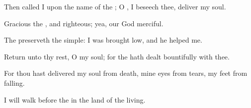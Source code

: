 {\par }{\Q {}Then
called I upon the
name of the
{}; O
{}, I
beseech thee,
deliver my
soul.


\par }{\Q {}Gracious
{} the
{}, and
righteous; yea, our
God
{}
merciful.


\par }{\Q {}The
{}
preserveth the
simple: I was brought
low, and he
helped me.


\par }{\Q {}Return unto thy
rest, O my
soul; for the
{} hath dealt
bountifully with thee.


\par }{\Q {}For thou hast
delivered my
soul from
death, mine
eyes from
tears,
{} my
feet from
falling.


\par }{\Q {}I will
walk
before the
{} in the
land of the
living.


\par }{\BB \par }
